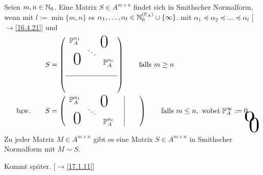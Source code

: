 \documentclass[../../main.tex]{subfiles}
\begin{document}
\begin{df}\label{17.1.2}
    Seien $m,n\in \mathbb N_0$. Eine Matrix $S\in A^{m\times n}$ findet sich in Smithscher Normalform, wenn mit $l:=\min\{m,n\}$ es $\alpha_1,\ldots ,\alpha_l\in \mathbb N_0^{(\mathbb P_A)}\cup\{\infty\}$. mit $\alpha_1\preceq\alpha_2\preceq\ldots \preceq\alpha_l$ [$\to$\ref{16.4.21}] und 
    \begin{align*}
        &S=\left(
            \begin{array}{c c c}
                \P_A^{\alpha_1}& \multicolumn{2}{c}{\text{\kern 1em\smash{\raisebox{-1.5ex}{\Huge 0}}}} \\
                & \ddots &  \\
                \multicolumn{2}{c}{\text{\kern-1.5em\smash{\raisebox{0ex}{\Huge 0}}}} &\P_A^{\alpha_l}\\
                & &\\
                \hline 
                &\tikz[remember picture]\node[inner sep=0pt] (a){ };&\\
                & &
            \end{array}
        \right)\qquad\text{falls }m\ge n\\
        \text{bzw.}\qquad&S=\left(
            \begin{array}{c c c c|c c}
                \P_A^{\alpha_1}& \multicolumn{2}{c}{\text{\kern 1em\smash{\raisebox{-1.5ex}{\Huge 0}}}}& &\tikz[remember picture]\node[inner sep=0pt] (b){ }; &\\
                & \ddots & & \\
                \multicolumn{2}{c}{\text{\kern-1.5em\smash{\raisebox{0ex}{\Huge 0}}}}& \P_A^{\alpha_l}& &\\
            \end{array}
        \right)\qquad\text{falls }m\le n,\text{ wobei } \P_A^\infty:=0. 
        \begin{tikzpicture}[overlay, remember picture]
            \node at (a.north) [anchor=center,yshift=-0.2cm, yscale=2,xscale=3] {$0$};
            \node at (b.east) [anchor=center, xshift=0.2cm,yshift=-0.6cm,  xscale=3, yscale=3] {$0$};
        \end{tikzpicture}
    \end{align*}
\end{df}

\begin{sat}\label{17.1.3}
    Zu jeder Matrix $M\in A^{m\times n}$ gibt es eine Matrix $S\in A^{m\times n}$ in Smithscher Normalform mit $M\sim S$.
\end{sat}
\begin{cproof}
    Kommt später. [$\to$\ref{17.1.11}]
\end{cproof}
\end{document}

